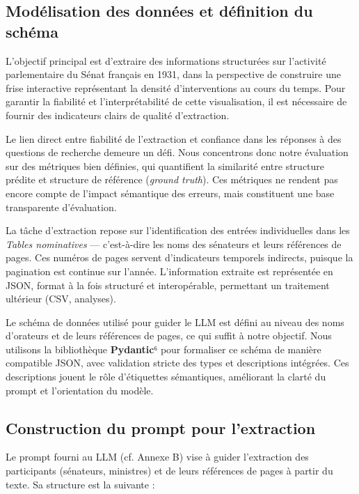 \subsection{Modélisation des données et définition du schéma}

L’objectif principal est d’extraire des informations structurées sur l’activité parlementaire du Sénat français en 1931, dans la perspective de construire une frise interactive représentant la densité d’interventions au cours du temps. Pour garantir la fiabilité et l’interprétabilité de cette visualisation, il est nécessaire de fournir des indicateurs clairs de qualité d’extraction.

Le lien direct entre fiabilité de l’extraction et confiance dans les réponses à des questions de recherche demeure un défi. Nous concentrons donc notre évaluation sur des métriques bien définies, qui quantifient la similarité entre structure prédite et structure de référence (\emph{ground truth}). Ces métriques ne rendent pas encore compte de l’impact sémantique des erreurs, mais constituent une base transparente d’évaluation.

La tâche d’extraction repose sur l’identification des entrées individuelles dans les \emph{Tables nominatives} — c’est-à-dire les noms des sénateurs et leurs références de pages. Ces numéros de pages servent d’indicateurs temporels indirects, puisque la pagination est continue sur l’année. L’information extraite est représentée en JSON, format à la fois structuré et interopérable, permettant un traitement ultérieur (CSV, analyses).

Le schéma de données utilisé pour guider le LLM est défini au niveau des noms d’orateurs et de leurs références de pages, ce qui suffit à notre objectif. Nous utilisons la bibliothèque \textbf{Pydantic}⁶ pour formaliser ce schéma de manière compatible JSON, avec validation stricte des types et descriptions intégrées. Ces descriptions jouent le rôle d’étiquettes sémantiques, améliorant la clarté du prompt et l’orientation du modèle.

\subsection{Construction du prompt pour l’extraction}

Le prompt fourni au LLM (cf. Annexe B) vise à guider l’extraction des participants (sénateurs, ministres) et de leurs références de pages à partir du texte. Sa structure est la suivante :

